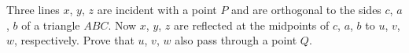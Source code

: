 Three lines $x$, $y$, $z$ are incident with a point $P$ and are orthogonal to the sides $c$, $a$, $b$ of a triangle $ABC$. Now $x$, $y$, $z$ are reflected at the midpoints of $c$, $a$, $b$ to $u$, $v$, $w$, respectively. Prove that $u$, $v$, $w$ also pass through a point $Q$.

